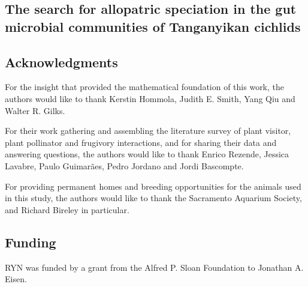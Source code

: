\begin{refsection}

\chapter{The search for allopatric speciation in the gut microbial communities of Tanganyikan cichlids}







\section{Acknowledgments}

For the insight that provided the mathematical foundation of this work, the authors would like to thank Kerstin Hommola, Judith E. Smith, Yang Qiu and Walter R. Gilks.

For their work gathering and assembling the literature survey of plant visitor, plant pollinator and frugivory interactions, and for sharing their data and answering questions, the authors would like to thank Enrico Rezende, Jessica Lavabre, Paulo Guimar{\~a}es, Pedro Jordano and Jordi Bascompte.

For providing permanent homes and breeding opportunities for the animals used in this study, the authors would like to thank the Sacramento Aquarium Society, and Richard Bireley in particular.

\section{Funding}

RYN was funded by a grant from the Alfred P. Sloan Foundation to Jonathan A. Eisen. 

\printbibliography[heading=subbibliography]

\end{refsection}